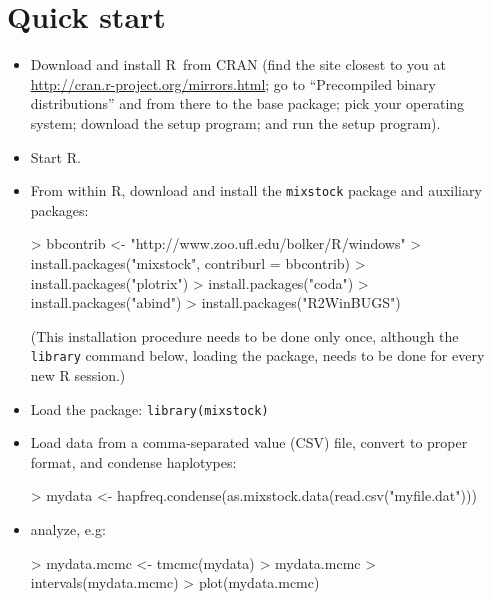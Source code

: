 \documentclass[11pt]{article}
\newcommand{\R}{{\sf R}}
\begin{document}
\section{Quick start}
\label{sec:quickstart}
\begin{itemize}
\item{Download and install \R\ from
CRAN (find the site closest to you
at \url{http://cran.r-project.org/mirrors.html};
go to ``Precompiled binary distributions'' and
from there to the base package; pick
your operating system; download the setup 
program; and run the setup program).
}
\item{Start \R.}
\item{From within \R,
download and install the {\tt mixstock}
package and auxiliary packages:
\begin{Schunk}
\begin{Sinput}
> bbcontrib <- "http://www.zoo.ufl.edu/bolker/R/windows"
> install.packages("mixstock", contriburl = bbcontrib)
> install.packages("plotrix")
> install.packages("coda")
> install.packages("abind")
> install.packages("R2WinBUGS")
\end{Sinput}
\end{Schunk}
(This installation procedure needs to be done
only once, although the {\tt library} command
below, loading the package, needs to be done for every new R session.)
}
\item{Load the package: {\tt library(mixstock)}}
\item{Load data from a comma-separated value (CSV) file,
convert to proper format, and condense haplotypes:
\begin{Schunk}
\begin{Sinput}
> mydata <- hapfreq.condense(as.mixstock.data(read.csv("myfile.dat")))
\end{Sinput}
\end{Schunk}
} 
\item{analyze, e.g:
\begin{Schunk}
\begin{Sinput}
> mydata.mcmc <- tmcmc(mydata)
> mydata.mcmc
> intervals(mydata.mcmc)
> plot(mydata.mcmc)
\end{Sinput}
\end{Schunk}
}
\end{itemize}
\end{document}
